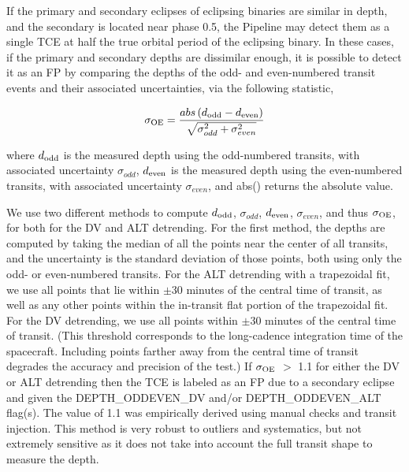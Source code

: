 \label{s:oddeven}
If the primary and secondary eclipses of eclipsing binaries are similar in depth, and the secondary is located near phase 0.5, the \kepler{} Pipeline may detect them as a single TCE at half the true orbital period of the eclipsing binary. In these cases, if the primary and secondary depths are dissimilar enough, it is possible to detect it as an FP by comparing the depths of the odd- and even-numbered transit events and their associated uncertainties, via the following statistic,

\begin{equation}
\sigma_{\rm OE} = \frac{abs\left(d_{\rm odd} - d_{\rm even}\right)}{\sqrt{\sigma_{odd}^{2} + \sigma_{even}^{2}}} 
\end{equation}

\noindent where $d_{\rm odd}$ is the measured depth using the odd-numbered transits, with associated uncertainty $\sigma_{odd}$, $d_{\rm even}$ is the measured depth using the even-numbered transits, with associated uncertainty $\sigma_{even}$, and abs() returns the absolute value.

We use two different methods to compute $d_{\rm odd}$, $\sigma_{odd}$, $d_{\rm even}$, $\sigma_{even}$, and thus $\sigma_{\rm OE}$, for both for the DV and ALT detrending. For the first method, the depths are computed by taking the median of all the points near the center of all transits, and the uncertainty is the standard deviation of those points, both using only the odd- or even-numbered transits. For the ALT detrending with a trapezoidal fit, we use all points that lie within $\pm$30 minutes of the central time of transit, as well as any other points within the in-transit flat portion of the trapezoidal fit. For the DV detrending, we use all points within $\pm$30 minutes of the central time of transit. (This threshold corresponds to the long-cadence integration time of the \kepler{} spacecraft. Including points farther away from the central time of transit degrades the accuracy and precision of the test.) If $\sigma_{\rm OE}$ $>$ 1.1 for either the DV or ALT detrending then the TCE is labeled as an FP due to a secondary eclipse and given the DEPTH\_ODDEVEN\_DV and/or DEPTH\_ODDEVEN\_ALT flag(s). The value of 1.1 was empirically derived using manual checks and transit injection. This method is very robust to outliers and systematics, but not extremely sensitive as it does not take into account the full transit shape to measure the depth.

